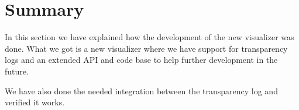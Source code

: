 \documentclass[../Main/thesis.tex]{subfiles}
\begin{document}
\section*{Summary}\label{sec:development-summary}
In this section we have explained how the development of the new visualizer was
done. What we got is a new visualizer where we have support for transparency
logs and an extended API and code base to help further development in the
future.

We have also done the needed integration between the transparency log and
verified it works.

\blankpage
\end{document}
